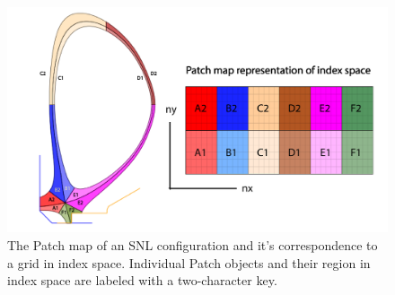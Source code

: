 

\begin{figure}[H]
    \centering
    \includegraphics[width=\linewidth]{figures/patch_index_space.pdf}
    \caption{The Patch map of an SNL configuration and it's correspondence to a grid in index space. Individual Patch objects and their region in index space are labeled with a two-character key.}
    \label{fig:snl_patch_index_space}
\end{figure}

